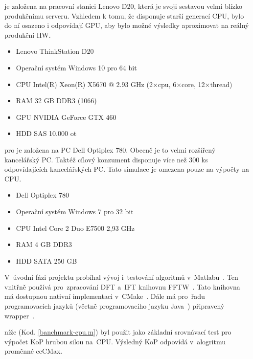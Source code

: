 

je založena na pracovní stanici Lenovo D20, která je svoji sestavou velmi blízko produkčnímu serveru. Vzhledem k tomu, že disponuje starší generací CPU, bylo do ní osazeno i odpovídají GPU, aby bylo možné výsledky aproximovat na reálný produkční HW.
\begin{itemize}
	\setlength{\parskip}{0pt}
	\setlength{\itemsep}{0pt}
	\item {Lenovo ThinkStation D20}
	\item {Operační systém Windows 10 pro 64 bit}
    \item {CPU Intel(R) Xeon(R) X5670 @ 2.93 GHz (2×cpu, 6×core, 12×thread)}
    \item {RAM 32 GB DDR3 (1066)}
    \item {GPU NVIDIA GeForce GTX 460}
    \item {HDD SAS 10.000 ot}
\end{itemize}

pro je založena na PC Dell Optiplex 780. Obecně je to velmi rozšířený kancelářský PC. Taktéž cílový konzument disponuje více než 300 ks odpovídajících kancelářských PC. Tato simulace je omezena pouze na výpočty na CPU.
\begin{itemize}
	\setlength{\parskip}{0pt}
	\setlength{\itemsep}{0pt}
	\item {Dell Optiplex 780}
	\item {Operační systém Windows 7 pro 32 bit}
	\item {CPU Intel Core 2 Duo E7500 2,93 GHz}
	\item {RAM 4 GB DDR3}
	\item {HDD SATA 250 GB}
\end{itemize}

V~úvodní fázi projektu probíhal vývoj i~testování algoritmů v~Matlabu~\cite{matlab}. Ten vnitřně používá pro~zpracování DFT a~IFT knihovnu FFTW~\cite{fftw}. Tato knihovna má dostupnou nativní implementaci v~CMake~\cite{cmake}. Dále má pro~řadu programovacích jazyků (včetně programovacího jazyku Java~\cite{FFT-java}) připravený wrapper~\cite{wrapper}.

níže (Kod. \ref{banchmark-cpu.m}) byl použit jako základní srovnávací test pro výpočet KoP hrubou silou na~CPU. Výsledný KoP odpovídá v~alogritmu proměnné ccCMax.

